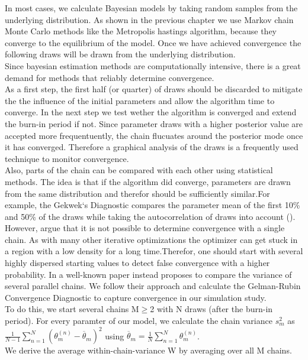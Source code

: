 In most cases, we calculate Bayesian models by taking random samples from the underlying distribution. As shown in the previous chapter we use Markov chain Monte Carlo methods like the Metropolis hastings algorithm, because they converge to the equilibrium of the model. Once we have achieved convergence the following draws will be drawn from the underlying distribution. \\
Since bayesian estimation methods are computationally intensive, there is a great demand for methods that reliably determine convergence.\\
As a first step, the first half (or quarter) of draws should be discarded to mitigate the the influence of the initial parameters and allow the algorithm time to converge. In the next step we test wether the algorithm is converged and extend the burn-in period if not.
Since parameter draws with a higher posterior value are accepted more frequentuently, the chain flucuates around the posterior mode once it has converged. Therefore a graphical analysis of the draws is a frequently used technique to monitor convergence.\\
Also, parts of the chain can be compared with each other using statistical methods. The idea is that if the algorithm did converge, parameters are drawn from the same distribution and therefor should be sufficiently similar.For example, the Gekwek`s Diagnostic compares the parameter mean of the first 10\% and 50\% of the draws while taking the autocorrelation of draws into account (\cite{geweke1992}).\\
However, \cite{brooks1998} argue that it is not possible to determine convergence with a single chain. As with many other iterative optimizations the optimizer can get stuck in a region with a low density for a long time.Therefor, one should start with several highly dispersed starting values to detect false convergence with a higher probability. In a well-known paper \cite{gelman1992} instead proposes to compare the variance of several parallel chains.
We follow their approach and calculate the Gelman-Rubin Convergence Diagnostic to capture convergence in our simulation study.\\
To do this, we start several chains M$\geq$2 with N draws (after the burn-in period). 
For every paramter of our model, we calculate the chain variance $s_m^2$ as $\frac{1}{N-1}\sum_{n=1}^{N} (\theta_m^{(n)}-\overline{\theta}_m )^2$ using $\overline{\theta}_m=\frac{1}{N} \sum_{n=1}^{N} \theta_m^{(n)}$.\\
We derive the average within-chain-variance W by averaging over all M chains.\\
